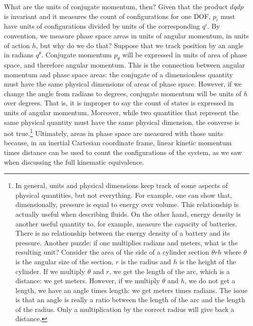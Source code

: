What are the units of conjugate momentum, then? Given that the product $dq dp$ is invariant and it measures the count of configurations for one DOF, $p_i$ must have units of configurations divided by units of the corresponding $q^i$. By convention, we measure phase space areas in units of angular momentum, in units of action $h$, but why do we do that? Suppose that we track position by an angle in radians $q^\theta$. Conjugate momentum $p_\theta$ will be expressed in units of area of phase space, and therefore angular momentum. This is the connection between angular momentum and phase space areas: the conjugate of a dimensionless quantity must have the same physical dimensions of areas of phase space. However, if we change the angle from radians to degrees, conjugate momentum will be units of $h$ over degrees. That is, it is improper to say the count of states is expressed in units of angular momentum. Moreover, while two quantities that represent the same physical quantity must have the same physical dimension, the converse is not true.\footnote{In general, units and physical dimensions keep track of some aspects of physical quantities, but not everything. For example, one can show that, dimensionally, pressure is equal to energy over volume. This relationship is actually useful when describing fluids. On the other hand, energy density is another useful quantity to, for example, measure the capacity of batteries. There is no relationship between the energy density of a battery and its pressure. Another puzzle: if one multiplies radians and meters, what is the resulting unit? Consider the area of the side of a cylinder section $\theta r h$ where $\theta$ is the angular size of the section, $r$ is the radius and $h$ is the height of the cylinder. If we multiply $\theta$ and $r$, we get the length of the arc, which is a distance: we get meters. However, if we multiply $\theta$ and $h$, we do not get a length, we have an angle times length: we get meters times radians. The issue is that an angle is really a ratio between the length of the arc and the length of the radius. Only a multiplication by the correct radius will give back a distance.} Ultimately, areas in phase space are measured with those units because, in an inertial Cartesian coordinate frame, linear kinetic momentum times distance can be used to count the configurations of the system, as we saw when discussing the full kinematic equivalence.

